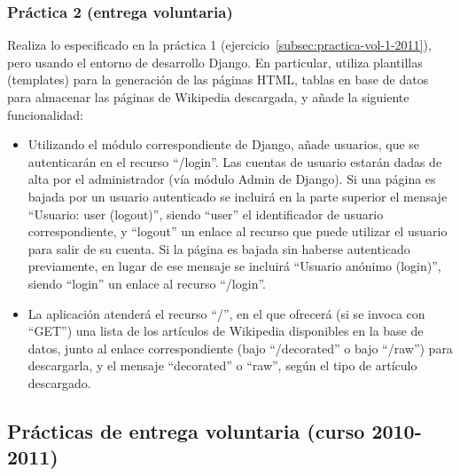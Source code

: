 \subsubsection{Práctica 2 (entrega voluntaria)}
\label{subsec:practica-vol-2-2011}


Realiza lo especificado en la práctica 1 (ejercicio~\ref{subsec:practica-vol-1-2011}), pero usando el entorno de desarrollo Django. En particular, utiliza plantillas (templates) para la generación de las páginas HTML, tablas en base de datos para almacenar las páginas de Wikipedia descargada, y añade la siguiente funcionalidad:

\begin{itemize}
\item Utilizando el módulo correspondiente de Django, añade usuarios, que se autenticarán en el recurso ``/login''. Las cuentas de usuario estarán dadas de alta por el administrador (vía módulo Admin de Django). Si una página es bajada por un usuario autenticado se incluirá en la parte superior el mensaje ``Usuario: user (logout)'', siendo ``user'' el identificador de usuario correspondiente, y ``logout'' un enlace al recurso que puede utilizar el usuario para salir de su cuenta. Si la página es bajada sin haberse autenticado previamente, en lugar de ese mensaje se incluirá ``Usuario anónimo (login)'', siendo ``login'' un enlace al recurso ``/login''.
\item La aplicación atenderá el recurso ``/'', en el que ofrecerá (si se invoca con ``GET'') una lista de los artículos de Wikipedia disponibles en la base de datos, junto al enlace correspondiente (bajo ``/decorated'' o bajo ``/raw'') para descargarla, y el mensaje ``decorated'' o ``raw'', según el tipo de artículo descargado.
\end{itemize}


\subsection{Prácticas de entrega voluntaria (curso 2010-2011)}

